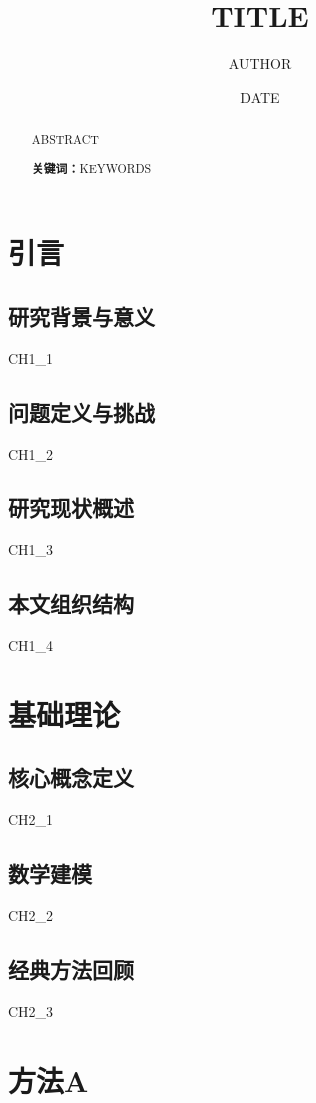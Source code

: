 \documentclass[12pt,a4paper]{ctexart}
\title{\textbf{{TITLE}}}
\author{{AUTHOR}}
\date{{DATE}}
\begin{document}
\maketitle

\begin{abstract}
{ABSTRACT}

\textbf{关键词：}{KEYWORDS}
\end{abstract}

\tableofcontents
\newpage

\section{引言}
\subsection{研究背景与意义}
{CH1_1}

\subsection{问题定义与挑战}
{CH1_2}

\subsection{研究现状概述}
{CH1_3}

\subsection{本文组织结构}
{CH1_4}

\section{基础理论}
\subsection{核心概念定义}
{CH2_1}

\subsection{数学建模}
{CH2_2}

\subsection{经典方法回顾}
{CH2_3}

\section{方法A}
\end{document}
